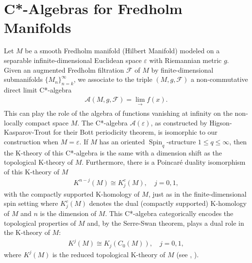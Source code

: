 \documentclass[11pt, twoside, a4paper]{article}
\theoremstyle{mytheoremstyle}
\begin{document}
\section{C*-Algebras for Fredholm Manifolds}
Let \(M\) be a smooth Fredholm manifold (Hilbert Manifold) modeled on a separable infinite-dimensional Euclidean space \(\varepsilon\) with Riemannian metric \(g\). Given an augmented Fredholm filtration \(\mathcal{F}\) of \(M\) by finite-dimensional submanifolds \(\{M_{n}\}_{n=k}^{\infty}\), we associate to the triple \((M,g, \mathcal{F})\) a non-commutative direct limit C*-algebra
\begin{align}
    \mathcal{A}(M,g,\mathcal{F}) = \lim_{\substack{\to}} f(x).
\end{align}
This can play the role of the algebra of functions vanishing at infinity on the non-locally compact space \(M\). The C*-algebra \(\mathcal{A}(\varepsilon)\), as constructed by Higson-Kasparov-Trout for their Bott periodicity theorem, is isomorphic to our construction when \(M=\varepsilon\). If \(M\) has an oriented \(\operatorname{Spin}_{q}\)-structure \(1 \leq q \leq \infty\), then the K-theory of this C*-algebra is the same with a dimension shift as the topological K-theory of \(M\). Furthermore, there is a Poincaré duality isomorphism of this K-theory of \(M\)
\begin{align}
    K^{n-j}(M) \cong K_{j}^{c}(M), \quad j=0,1,
\end{align}
with the compactly supported K-homology of \(M\), just as in the finite-dimensional spin setting where \(K_{j}^{c}(M)\) denotes the dual (compactly supported) K-homology of \(M\) and \(n\) is the dimension of \(M\). This C*-algebra categorically encodes the topological properties of \(M\) and, by the Serre-Swan theorem, plays a dual role in the K-theory of \(M\):
\begin{align}
    K^{j}(M) \cong K_{j}(C_{0}(M)), \quad j=0,1,
\end{align}
where \(K^{j}(M)\) is the reduced topological K-theory of \(M\) (see \cite{eells1992}, \cite{kasparov1988}).
\end{document}
